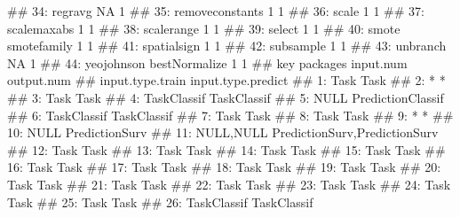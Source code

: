\documentclass[
  11pt,
  parskip=half,
  DIV=calc,
  BCOR=10mm,
  x11names]{scrbook}
\newenvironment{Shaded}{}{}
\newcommand{\NormalTok}[1]{#1}
\begin{document}
\begin{Shaded}
\begin{Highlighting}[]
\NormalTok{## 34:         regravg                      NA          1}
\NormalTok{## 35: removeconstants                       1          1}
\NormalTok{## 36:           scale                       1          1}
\NormalTok{## 37:     scalemaxabs                       1          1}
\NormalTok{## 38:      scalerange                       1          1}
\NormalTok{## 39:          select                       1          1}
\NormalTok{## 40:           smote   smotefamily         1          1}
\NormalTok{## 41:     spatialsign                       1          1}
\NormalTok{## 42:       subsample                       1          1}
\NormalTok{## 43:        unbranch                      NA          1}
\NormalTok{## 44:      yeojohnson bestNormalize         1          1}
\NormalTok{##                 key      packages input.num output.num}
\NormalTok{##     input.type.train            input.type.predict}
\NormalTok{##  1:             Task                          Task}
\NormalTok{##  2:                *                             *}
\NormalTok{##  3:             Task                          Task}
\NormalTok{##  4:      TaskClassif                   TaskClassif}
\NormalTok{##  5:             NULL             PredictionClassif}
\NormalTok{##  6:      TaskClassif                   TaskClassif}
\NormalTok{##  7:             Task                          Task}
\NormalTok{##  8:             Task                          Task}
\NormalTok{##  9:                *                             *}
\NormalTok{## 10:             NULL                PredictionSurv}
\NormalTok{## 11:        NULL,NULL PredictionSurv,PredictionSurv}
\NormalTok{## 12:             Task                          Task}
\NormalTok{## 13:             Task                          Task}
\NormalTok{## 14:             Task                          Task}
\NormalTok{## 15:             Task                          Task}
\NormalTok{## 16:             Task                          Task}
\NormalTok{## 17:             Task                          Task}
\NormalTok{## 18:             Task                          Task}
\NormalTok{## 19:             Task                          Task}
\NormalTok{## 20:             Task                          Task}
\NormalTok{## 21:             Task                          Task}
\NormalTok{## 22:             Task                          Task}
\NormalTok{## 23:             Task                          Task}
\NormalTok{## 24:             Task                          Task}
\NormalTok{## 25:             Task                          Task}
\NormalTok{## 26:      TaskClassif                   TaskClassif}

\end{Highlighting}
\end{Shaded}
\end{document}
